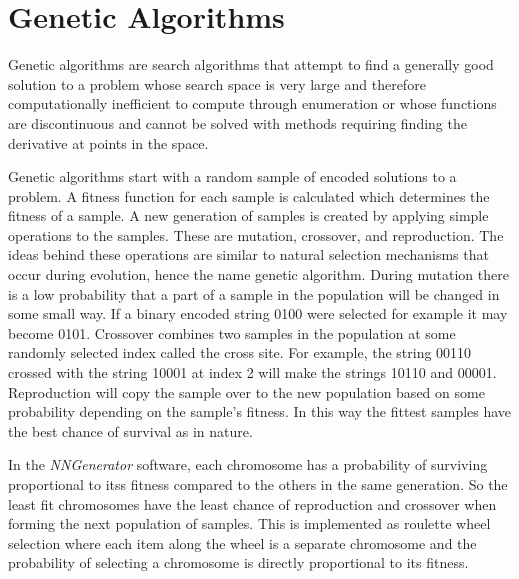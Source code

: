 \chapter[Genetic Algorithms]{Genetic Algorithms}
Genetic algorithms are search algorithms that attempt to find a generally good solution to a problem whose search space
is very large and therefore computationally inefficient to compute through enumeration or whose functions are discontinuous and cannot
be solved with methods requiring finding the derivative at points in the space. 

Genetic algorithms start with a random sample of encoded solutions to a problem. 
A fitness function for each sample is calculated which determines the fitness of a sample. 
A new generation of samples is created by applying simple operations to the samples. 
These are mutation, crossover, and reproduction. 
The ideas behind these operations are similar to natural selection mechanisms that occur during evolution, hence the name genetic algorithm. 
During mutation there is a low probability that a part of a sample in the population will be changed in some small way. 
If a binary encoded string 0100 were selected for example it may become 0101. 
Crossover combines two samples in the population at some randomly selected index called the cross site. 
For example, the string 00110 crossed with the string 10001 at index 2 will make the strings 10110 and 00001. 
Reproduction will copy the sample over to the new population based on some probability depending on the sample's fitness. 
In this way the fittest samples have the best chance of survival as in nature.

In the {\it NNGenerator} software, each chromosome has a probability of surviving proportional to itss fitness compared to the others in the same generation. 
So the least fit chromosomes have the least chance of reproduction and crossover when forming the next population of samples. 
This is implemented as roulette wheel selection where each item along the wheel is a separate chromosome and the probability of selecting a chromosome is directly proportional to its fitness.    

